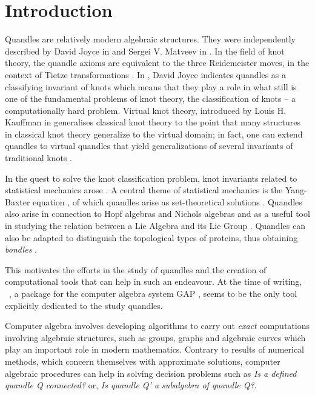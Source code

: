 \chapter{Introduction}\label{introduction}
\noindent
Quandles are relatively modern algebraic structures. They were independently described by David Joyce in \cite{JOYCE198237} and Sergei V. Matveev in \cite{SergeiMatveevDisGrou}. In the field of knot theory, the quandle axioms are equivalent to the three Reidemeister moves, in the context of Tietze transformations \cite{lie2algebras, nelson2005signed}.  In \cite{JOYCE198237}, David Joyce indicates quandles as a classifying invariant of knots which means that they play a role in what still is one of the fundamental problems of knot theory, the classification of knots -- a computationally hard problem\label{intro1Connected}. Virtual knot theory, introduced by Louis H. Kauffman in \cite{kauffman2012introduction} generalises classical knot theory to the point that many structures in classical knot theory generalize to the virtual domain; in fact, one can extend quandles to virtual quandles that yield generalizations of several invariants of traditional knots \cite{kauffman2005virtual}. 

In the quest to solve the knot classification problem, knot invariants related to statistical mechanics arose \cite{jones1989knot, kauffman1988statistical, turaev1990yang}. A central theme of statistical mechanics is the Yang-Baxter equation \cite{wu1993yang}, of which quandles arise as set-theoretical solutions \cite{ETINGOF2001709}. 
Quandles also arise in connection to Hopf algebras and Nichols algebras \cite{andruskiewitsch2003racks} and as a useful tool in studying the relation between a Lie Algebra and its Lie Group \cite{lie2algebras}. Quandles can also be adapted to distinguish the topological types of proteins, thus obtaining \emph{bondles} \cite{adams2020knot}.

This motivates the efforts in the study of quandles and the creation of computational tools that can help in such an endeavour. At the time of writing, \rig~\cite{RiGapVendramin}, a package for the computer algebra system \textsc{GAP} \cite{GAPLinton}, seems to be the only tool explicitly dedicated to the study quandles. \newline 

Computer algebra involves developing algorithms to carry out \emph{exact} computations involving algebraic structures, such as groups, graphs and algebraic curves which play an important role in modern mathematics. Contrary to results of numerical methods, which concern themselves with approximate solutions, computer algebraic procedures can help in solving decision problems such as \textit{Is a defined quandle Q connected?} or, \textit{Is quandle Q' a subalgebra of quandle Q?}. \newline

